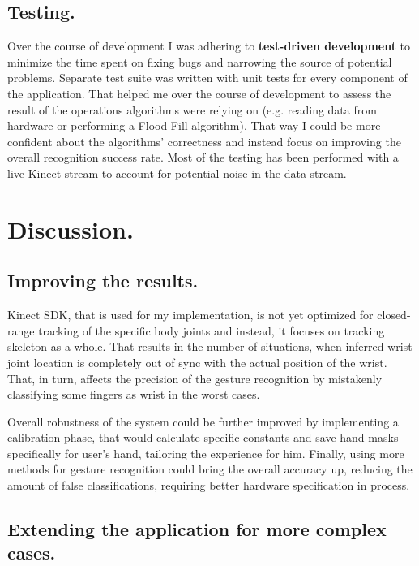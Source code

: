 \documentclass[a4paper,11pt,oneside]{article}
\begin{document}
\subsection{Testing.}
Over the course of development I was adhering to \textbf{test-driven development} to minimize the time spent on fixing bugs and narrowing the source of potential problems. Separate test suite was written with unit tests for every component of the application. That helped me over the course of development to assess the result of the operations algorithms were relying on (e.g. reading data from hardware or performing a Flood Fill algorithm). That way I could be more confident about the algorithms' correctness and instead focus on improving the overall recognition success rate. Most of the testing has been performed with a live Kinect stream to account for potential noise in the data stream.

\section{Discussion.}

\subsection{Improving the results.}
Kinect SDK, that is used for my implementation, is not yet optimized for closed-range tracking of the specific body joints and instead, it focuses on tracking skeleton as a whole. That results in the number of situations, when inferred wrist joint location is completely out of sync with the actual position of the wrist. That, in turn, affects the precision of the gesture recognition by mistakenly classifying some fingers as wrist in the worst cases. 

Overall robustness of the system could be further improved by implementing a calibration phase, that would calculate specific constants and save hand masks specifically for user's hand, tailoring the experience for him. Finally, using more methods for gesture recognition could bring the overall accuracy up, reducing the amount of false classifications, requiring better hardware specification in process.

\subsection{Extending the application for more complex cases.}
\end{document}
